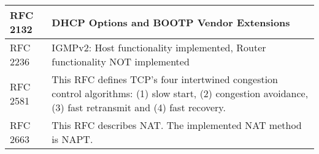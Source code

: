 \begin{longtable}{ | l | p{13cm} | }
RFC 2132 &
DHCP Options and BOOTP Vendor Extensions \\ \hline

RFC 2236 &
IGMPv2: Host functionality implemented, Router functionality NOT implemented \\ \hline

RFC 2581 &
This RFC defines TCP's four intertwined congestion control algorithms: (1) slow start, (2) congestion avoidance, (3) fast retransmit and (4) fast recovery. \\ \hline

RFC 2663 &
This RFC describes NAT. The implemented NAT method is NAPT.  \\ \hline


\end{longtable}
